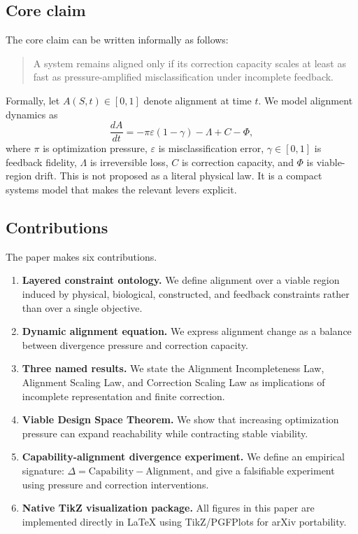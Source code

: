 \documentclass[11pt]{article}
\newcommand{\eps}{\varepsilon}
\begin{document}
\subsection{Core claim}

The core claim can be written informally as follows:
\begin{quote}
A system remains aligned only if its correction capacity scales at least as fast as pressure-amplified misclassification under incomplete feedback.
\end{quote}

Formally, let \(A(S,t)\in[0,1]\) denote alignment at time \(t\). We model alignment dynamics as
\begin{equation}
\frac{dA}{dt} = -\pi\eps(1-\gamma) - \Lambda + C - \Phi,
\label{eq:alignment-dynamics}
\end{equation}
where \(\pi\) is optimization pressure, \(\eps\) is misclassification error, \(\gamma\in[0,1]\) is feedback fidelity, \(\Lambda\) is irreversible loss, \(C\) is correction capacity, and \(\Phi\) is viable-region drift. This is not proposed as a literal physical law. It is a compact systems model that makes the relevant levers explicit.

\subsection{Contributions}

The paper makes six contributions.

\begin{enumerate}
    \item \textbf{Layered constraint ontology.} We define alignment over a viable region induced by physical, biological, constructed, and feedback constraints rather than over a single objective.
    \item \textbf{Dynamic alignment equation.} We express alignment change as a balance between divergence pressure and correction capacity.
    \item \textbf{Three named results.} We state the Alignment Incompleteness Law, Alignment Scaling Law, and Correction Scaling Law as implications of incomplete representation and finite correction.
    \item \textbf{Viable Design Space Theorem.} We show that increasing optimization pressure can expand reachability while contracting stable viability.
    \item \textbf{Capability-alignment divergence experiment.} We define an empirical signature: \(\Delta = \mathrm{Capability} - \mathrm{Alignment}\), and give a falsifiable experiment using pressure and correction interventions.
    \item \textbf{Native TikZ visualization package.} All figures in this paper are implemented directly in \LaTeX{} using TikZ/PGFPlots for arXiv portability.
\end{enumerate}
\end{document}

